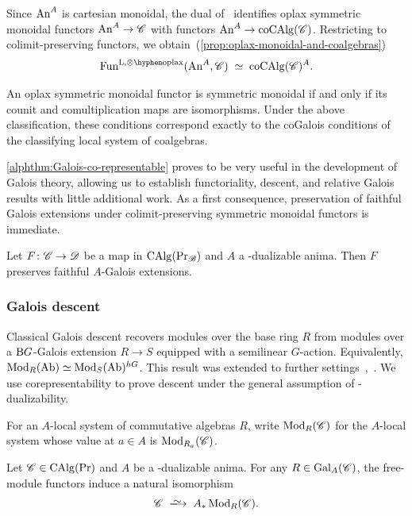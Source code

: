 \documentclass[english,svgnames,table]{article}
\begin{document}
    Since $\mathrm{An}^A$ is cartesian monoidal, the dual of~\cite[Theorem~2.4.3.18]{Lurie-HA} identifies oplax symmetric monoidal functors $\mathrm{An}^A \to \mathscr{C}$ with functors $\mathrm{An}^A \to \operatorname{coCAlg}(\mathscr{C})$.
    Restricting to colimit-preserving functors, we obtain~(\cref{prop:oplax-monoidal-and-coalgebras})
    \begin{equation*}
        \FunLoplax(\An^A, \cC) \;\simeq\; \coCAlg(\cC)^A.
    \end{equation*}
    
    An oplax symmetric monoidal functor is symmetric monoidal if and only if its counit and comultiplication maps are isomorphisms.
    Under the above classification, these conditions correspond exactly to the coGalois conditions of the classifying local system of coalgebras.

    \cref{alphthm:Galois-co-representable} proves to be very useful in the development of Galois theory, allowing us to establish functoriality, descent, and relative Galois results with little additional work.
    As a first consequence, preservation of faithful Galois extensions under colimit-preserving symmetric monoidal functors is immediate.
    
    \begin{corollary}
        Let $F \colon \mathscr{C} \to \mathscr{D}$ be a map in $\operatorname{CAlg}(\operatorname{Pr}_{\mathscr{B}})$ and $A$ a \COB-dualizable anima. Then $F$ preserves faithful $A$-Galois extensions.
    \end{corollary}

    \subsubsection*{Galois descent}

    Classical Galois descent recovers modules over the base ring $R$ from modules over a $\mathrm{B} G$-Galois extension $R \to S$ equipped with a semilinear $G$-action.
    Equivalently, $\operatorname{Mod}_R(\mathrm{Ab}) \simeq \operatorname{Mod}_S(\mathrm{Ab})^{hG}$.
    This result was extended to further settings~\cite[Theorem~9.4]{Mathew-2016-Galois},~\cite[Proposition~3.11]{BMCSY-cycloshift}.
    We use corepresentability to prove descent under the general assumption of \CO-dualizability.

    For an $A$-local system of commutative algebras $R$, write $\operatorname{Mod}_R(\mathscr{C})$ for the $A$-local system whose value at $a \in A$ is $\operatorname{Mod}_{R_a}(\mathscr{C})$.
    
    \begin{alphThm}
    \label{thm:intro-Galois-descent}
        Let $\mathscr{C} \in \operatorname{CAlg}(\operatorname{Pr})$ and $A$ be a \CO-dualizable anima.
        For any $R \in \mathrm{Gal}_A(\mathscr{C})$, the free-module functors induce a natural isomorphism
        \begin{equation*}
            \cC \;\isotoo\; A_* \Mod_R(\cC).
        \end{equation*}
    \end{alphThm}
\end{document}
